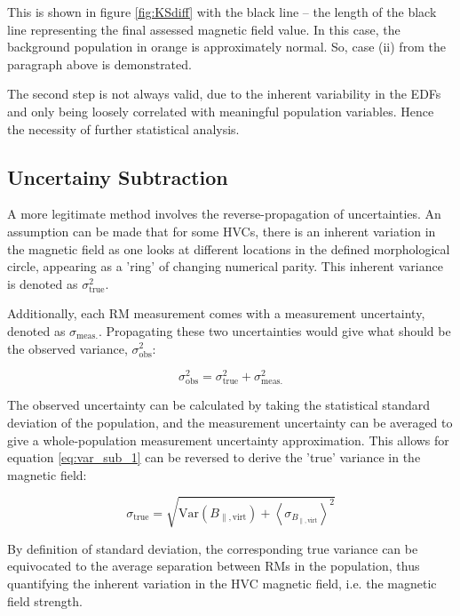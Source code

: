 This is shown in figure \ref{fig:KSdiff} with the black line – the length of the black line representing the final assessed magnetic field value. In this case, the background population in orange is approximately normal. So, case (ii) from the paragraph above is demonstrated.


The second step is not always valid, due to the inherent variability in the EDFs and only being loosely correlated with meaningful population variables. Hence the necessity of further statistical analysis.


\subsection{Uncertainy Subtraction}
\label{ssec:sigma_sub}

A more legitimate method involves the reverse-propagation of uncertainties. An assumption can be made that for some HVCs, there is an inherent variation in the magnetic field as one looks at different locations in the defined morphological circle, appearing as a 'ring' of changing numerical parity. This inherent variance is denoted as $\sigma_{\mathrm{true}}^2$.


Additionally, each RM measurement comes with a measurement uncertainty, denoted as $\sigma_{\mathrm{meas.}}$. Propagating these two uncertainties would give what should be the observed variance, $\sigma_{\mathrm{obs}}^2$:


\begin{equation}
    \sigma_{\mathrm{obs}}^2 = \sigma_{\mathrm{true}}^2 + \sigma_{\mathrm{meas.}}^2
\label{eq:var_sub_1}
\end{equation}


The observed uncertainty can be calculated by taking the statistical standard deviation of the population, and the measurement uncertainty can be averaged to give a whole-population measurement uncertainty approximation. This allows for equation \ref{eq:var_sub_1} can be reversed to derive the 'true' variance in the magnetic field:


\begin{equation}
    \sigma_{\mathrm{true}} = \sqrt{\mathrm{Var}\left(B_{\parallel, \mathrm{virt}}\right) + {\left<\sigma_{B_{\parallel, \mathrm{virt}}}\right>}^2}
\label{eq:var_sub_2}
\end{equation}


By definition of standard deviation, the corresponding true variance can be equivocated to the average separation between RMs in the population, thus quantifying the inherent variation in the HVC magnetic field, i.e. the magnetic field strength.



